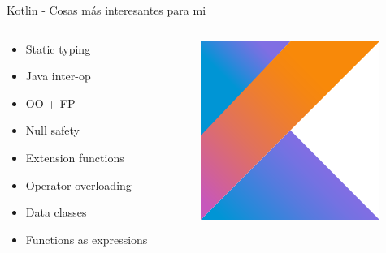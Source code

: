 \documentclass[aspectratio=169]{beamer}
\begin{document}
\begin{frame}{Kotlin - Cosas más interesantes para mi}
\begin{columns}
	\begin{column}{0.5\textwidth}
		\begin{itemize}
			\item Static typing
			\item Java inter-op
			\item OO + FP
			\item Null safety
			\item Extension functions
			\item Operator overloading
			\item Data classes
			\item Functions as expressions
		\end{itemize}
	\end{column}
	\begin{column}{0.5\textwidth}  %
		\begin{figure}
			\centering
			\includegraphics[width=0.7\linewidth]{Images/kotlin}
		\end{figure}
	\end{column}
\end{columns}
\end{frame}
\end{document}
